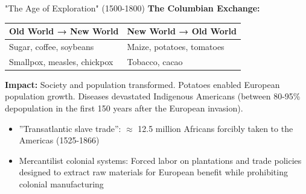 \documentclass{beamer}
\begin{document}
\begin{frame}{"The Age of Exploration" (1500-1800)}
\small
    \textbf{The Columbian Exchange:} %
    \begin{table}[h]
    \scriptsize
    \begin{tabular}{p{4cm}|p{4cm}}
    \toprule
    \textbf{Old World → New World} & \textbf{New World → Old World} \\
    \midrule
    Sugar, coffee, soybeans & Maize, potatoes, tomatoes \\
    Smallpox, measles, chickpox & Tobacco, cacao \\
    \bottomrule
    \end{tabular}
    \end{table}
    \textbf{Impact:} Society and population transformed. Potatoes enabled European population growth. Diseases devastated Indigenous Americans (between 80-95\% depopulation in the first 150 years after the European invasion).
    \begin{itemize} \small
        \item ''Transatlantic slave trade'': $\approx$ 12.5 million Africans forcibly taken to the Americas (1525-1866)
        \item Mercantilist colonial systems: Forced labor on plantations and trade policies designed to extract raw materials for European benefit while prohibiting colonial manufacturing
    \end{itemize}
\end{frame}
\end{document}

